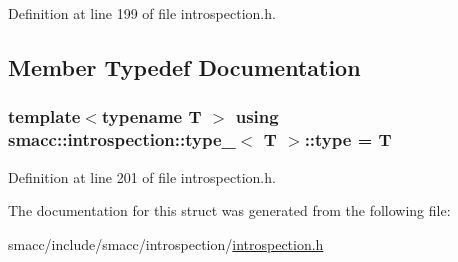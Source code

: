 Definition at line 199 of file introspection.\+h.



\subsection{Member Typedef Documentation}
\subsubsection[{\texorpdfstring{type}{type}}]{\setlength{\rightskip}{0pt plus 5cm}template$<$typename T $>$ using {\bf smacc\+::introspection\+::type\+\_\+}$<$ T $>$\+::{\bf type} =  T}\hypertarget{structsmacc_1_1introspection_1_1type___afe9e4516cea9d3160f2eff1b787ca4f5}{}\label{structsmacc_1_1introspection_1_1type___afe9e4516cea9d3160f2eff1b787ca4f5}


Definition at line 201 of file introspection.\+h.



The documentation for this struct was generated from the following file\+:\begin{DoxyCompactItemize}
\item 
smacc/include/smacc/introspection/\hyperlink{introspection_8h}{introspection.\+h}\end{DoxyCompactItemize}
